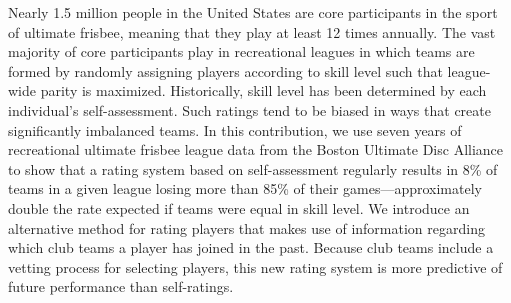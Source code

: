 Nearly 1.5 million people in the United States are core participants in the sport of ultimate frisbee, meaning that they play at least 12 times annually. The vast majority of core participants play in recreational leagues in which teams are formed by randomly assigning players according to skill level such that league-wide parity is maximized. Historically, skill level has been determined by each individual’s self-assessment. Such ratings tend to be biased in ways that create significantly imbalanced teams. In this contribution, we use seven years of recreational ultimate frisbee league data from the Boston Ultimate Disc Alliance to show that a rating system based on self-assessment regularly results in 8\% of teams in a given league losing more than 85\% of their games---approximately double the rate expected if teams were equal in skill level.  We introduce an alternative method for rating players that makes use of information regarding which club teams a player has joined in the past. Because club teams include a vetting process for selecting players, this new rating system is more predictive of future performance than self-ratings. 